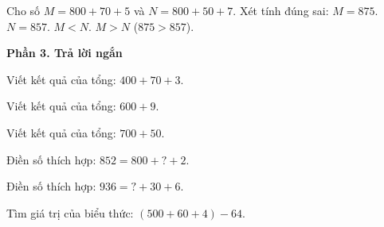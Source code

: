 \begin{ex} %
Cho số $M = 800 + 70 + 5$ và $N = 800 + 50 + 7$. Xét tính đúng sai:
\choiceTF
{\True $M = 875$.}
{\True $N = 857$.}
{$M < N$.}
{\True $M > N$ ($875 > 857$).}
\end{ex}

\textbf{Phần 3. Trả lời ngắn}

\begin{ex} %
Viết kết quả của tổng: $400 + 70 + 3$.
\end{ex}

\begin{ex} %
Viết kết quả của tổng: $600 + 9$.
\end{ex}

\begin{ex} %
Viết kết quả của tổng: $700 + 50$.
\end{ex}

\begin{ex} %
Điền số thích hợp: $852 = 800 + ? + 2$.
\end{ex}

\begin{ex} %
Điền số thích hợp: $936 = ? + 30 + 6$.
\end{ex}

\begin{ex} %
Tìm giá trị của biểu thức: $(500 + 60 + 4) - 64$.
\end{ex}
